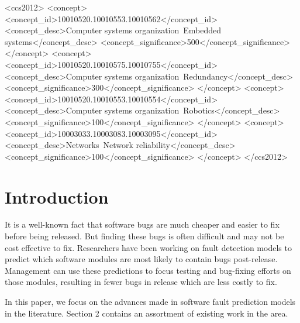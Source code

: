 \documentclass{sig-alternate-05-2015}
\begin{document}
%
%
\begin{CCSXML}
<ccs2012>
 <concept>
  <concept_id>10010520.10010553.10010562</concept_id>
  <concept_desc>Computer systems organization~Embedded systems</concept_desc>
  <concept_significance>500</concept_significance>
 </concept>
 <concept>
  <concept_id>10010520.10010575.10010755</concept_id>
  <concept_desc>Computer systems organization~Redundancy</concept_desc>
  <concept_significance>300</concept_significance>
 </concept>
 <concept>
  <concept_id>10010520.10010553.10010554</concept_id>
  <concept_desc>Computer systems organization~Robotics</concept_desc>
  <concept_significance>100</concept_significance>
 </concept>
 <concept>
  <concept_id>10003033.10003083.10003095</concept_id>
  <concept_desc>Networks~Network reliability</concept_desc>
  <concept_significance>100</concept_significance>
 </concept>
</ccs2012>  
\end{CCSXML}



%
%

%
%



\section{Introduction}
It is a well-known fact that software bugs are much cheaper and easier to fix before being released. But finding these bugs is often difficult and may not be cost effective to fix. Researchers have been working on fault detection models to predict which software modules are most likely to contain bugs post-release. Management can use these predictions to focus testing and bug-fixing efforts on those modules, resulting in fewer bugs in release which are less costly to fix.

In this paper, we focus on the advances made in software fault prediction models in the literature. Section 2 contains an assortment of existing work in the area.
\end{document}
